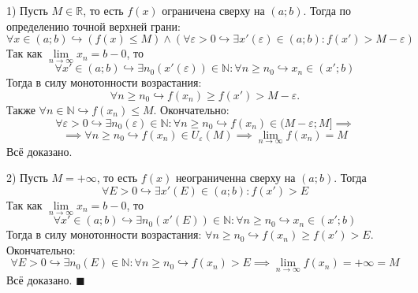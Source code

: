 \documentclass[12pt, a4paper, reqno]{article}
\begin{document}
    1) Пусть $M\in\mathbb{R}$, то есть $f(x)$ ограничена сверху на $(a; b)$. Тогда по определению
    точной верхней грани:
    \begin{equation*}
        \forall x\in (a; b)\hookrightarrow (f(x)\leq M)\wedge(\forall\varepsilon > 0 \hookrightarrow
        \exists x'(\varepsilon)\in(a; b): f(x') > M - \varepsilon)
    \end{equation*}
    Так как $\lim\limits_{n\to\infty} x_n = b - 0$, то
    \begin{equation*}
        \forall x'\in(a; b)\hookrightarrow \exists n_0(x'(\varepsilon))\in\mathbb{N}: \forall n \geq
        n_0 \hookrightarrow x_n\in (x'; b)
    \end{equation*}
    Тогда в силу монотонности возрастания:
    \begin{equation*}
        \forall n \geq n_0\hookrightarrow f(x_n) \geq f(x') > M - \varepsilon.
    \end{equation*}
    Также $\forall n\in\mathbb{N}\hookrightarrow f(x_n)\leq M$. Окончательно:
    \begin{equation*}
        \forall\varepsilon > 0\hookrightarrow\exists n_0(\varepsilon)\in\mathbb{N}: \forall n \geq
        n_0\hookrightarrow f(x_n) \in (M - \varepsilon; M] \implies
    \end{equation*}
    \begin{equation*}
        \implies \forall n \geq n_0\hookrightarrow f(x_n)\in U_{\varepsilon}(M) \implies
        \lim\limits_{n\to\infty} f(x_n) = M
    \end{equation*}
    Всё доказано.

    2) Пусть $M = +\infty$, то есть $f(x)$ неограниченна сверху на $(a; b)$. Тогда
    \begin{equation*}
        \forall E > 0 \hookrightarrow\exists x'(E)\in(a; b): f(x') > E
    \end{equation*}
    Так как $\lim\limits_{n\to\infty} x_n = b - 0$, то
    \begin{equation*}
        \forall x'\in(a; b)\hookrightarrow \exists n_0(x'(E))\in\mathbb{N}: \forall n \geq n_0
        \hookrightarrow x_n\in (x'; b)
    \end{equation*}
    Тогда в силу монотонности возрастания: $\forall n \geq n_0 \hookrightarrow f(x_n) \geq f(x')>
    E$. Окончательно:
    \begin{equation*}
        \forall E > 0\hookrightarrow\exists n_0(E)\in\mathbb{N}: \forall n \geq n_0 \hookrightarrow
        f(x_n) > E \implies \lim\limits_{n\to\infty} f(x_n) = +\infty = M
    \end{equation*}
    Всё доказано. $\blacksquare$
\end{document}
